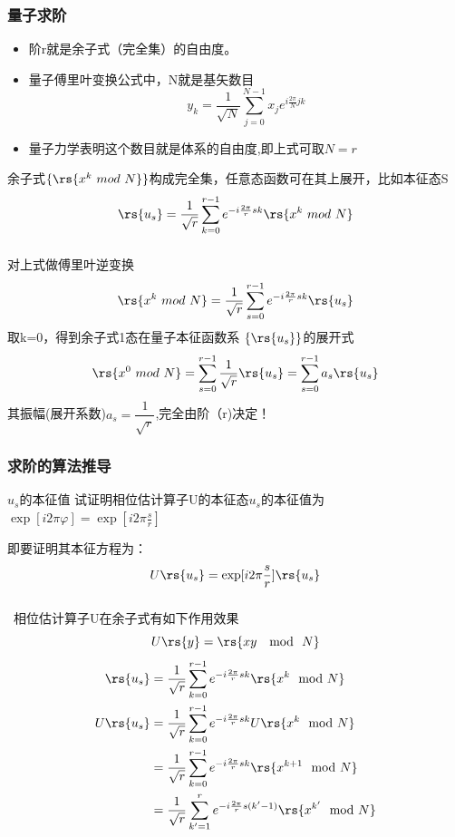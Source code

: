 \begin{frame}
    \frametitle{量子求阶}  
    \begin{itemize}
        \item 阶r就是余子式（完全集）的自由度。
        \item 量子傅里叶变换公式中，N就是基矢数目
        \[\boxed{y_k = \frac{1}{\sqrt{N}} \sum_{j=0} ^{N-1} x_j  e^{i \frac{2\pi}{N} jk} } \]
        \item 量子力学表明这个数目就是体系的自由度,即上式可取$N=r$
    \end{itemize}
    余子式$\{\rs{x^k~mod~N}\} $构成完全集，任意态函数可在其上展开，比如本征态S
    \[\rs{u_s} = \frac{1}{\sqrt{r}} \sum_{k=0} ^{r-1}  e^{-i \frac{2\pi}{r} sk} \rs{x^k~mod~N}  \]
\end{frame}

\begin{frame}
    \frametitle{}  
    对上式做傅里叶逆变换
    \[\rs{x^k~mod~N}   = \frac{1}{\sqrt{r}} \sum_{s=0} ^{r-1}  e^{-i \frac{2\pi}{r} sk} \rs{u_s} \]
    取k=0，得到余子式1态在量子本征函数系 $\{\rs{u_s}\}$的展开式
    \[\rs{x^0~mod~N}   =  \sum_{s=0} ^{r-1} \frac{1}{\sqrt{r}} \rs{u_s} =\sum_{s=0} ^{r-1} a_s \rs{u_s} \]
    其振幅(展开系数)$a_s=\dfrac{1}{\sqrt{r}}$,完全由阶（r)决定！  
\end{frame}

\begin{frame}
    \frametitle{求阶的算法推导} 
    \begin{center}
    \begin{tcolorbox1}[0.86]{$u_s$的本征值}
        试证明相位估计算子U的本征态$u_s$的本征值为$\exp[i2\pi\varphi]=\exp[i2\pi\frac{s}{r}]$
    \end{tcolorbox1}    
    \end{center}
 
     即要证明其本征方程为：
    \[U\rs{u_s}=\exp[i2\pi\frac{s}{r}] \rs{u_s}\]
\end{frame}

\begin{frame}
    \frametitle{}     
    \证~相位估计算子U在余子式有如下作用效果
    \[U\rs{y}=\rs{xy~\mod~N}\]
    \[\begin{aligned}
     \rs{u_s} &= \frac{1}{\sqrt{r}} \sum_{k=0} ^{r-1}  e^{-i \frac{2\pi}{r} sk} \rs{x^k \mod N}  \\
     U\rs{u_s} &= \frac{1}{\sqrt{r}} \sum_{k=0} ^{r-1}  e^{-i \frac{2\pi}{r} sk} U\rs{x^k \mod N}  \\
     &= \frac{1}{\sqrt{r}} \sum_{k=0} ^{r-1}  e^{-i \frac{2\pi}{r} sk} \rs{x^{k+1} \mod N}  \\
     &= \frac{1}{\sqrt{r}} \sum_{k'=1} ^{r}  e^{-i \frac{2\pi}{r} s(k'-1)} \rs{x^{k'} \mod N} 
    \end{aligned}\]   
\end{frame}

